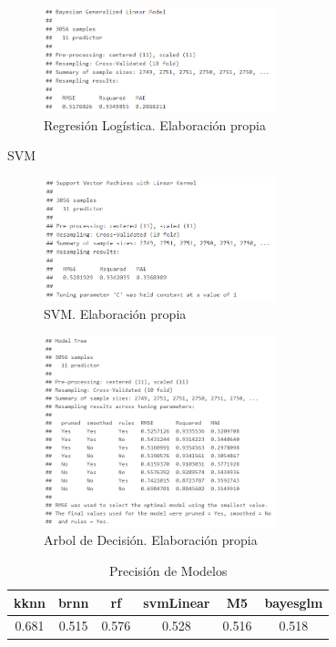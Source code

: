 \begin{subappendices}
\begin{figure}[htb]
	\centering
	\caption{Regresión Logística. Elaboración propia}
		\label{fig:regSUM}
	\includegraphics[width=0.6\textwidth]{recursos/ImagenesR/regSUM}
\end{figure}
\FloatBarrier
SVM
\begin{figure}[htb]
	\centering
	\caption{SVM. Elaboración propia}
		\label{fig:svmSUM}
	\includegraphics[width=0.6\textwidth]{recursos/ImagenesR/svmSUM}
\end{figure}
\FloatBarrier

\begin{figure}[htb]
	\centering
	\caption{Arbol de Decisión. Elaboración propia}
		\label{fig:treeSUM}
	\includegraphics[width=0.6\textwidth]{recursos/ImagenesR/treeSUM}

\end{figure}
\FloatBarrier

\begin{table}[!ht]
	\caption{Precisión de Modelos}
		\label{fig:ComparacionModelos}
\centering
\begin{tabular}{|c|c|c|c|c|c|}
	\hline 
	kknn & brnn & rf & svmLinear     & M5  & bayesglm \\ 
	\hline 
	0.681 & 0.515 & 0.576 & 0.528 & 0.516 & 0.518 \\ 
	\hline 
\end{tabular} 
\end{table}


\end{subappendices}
